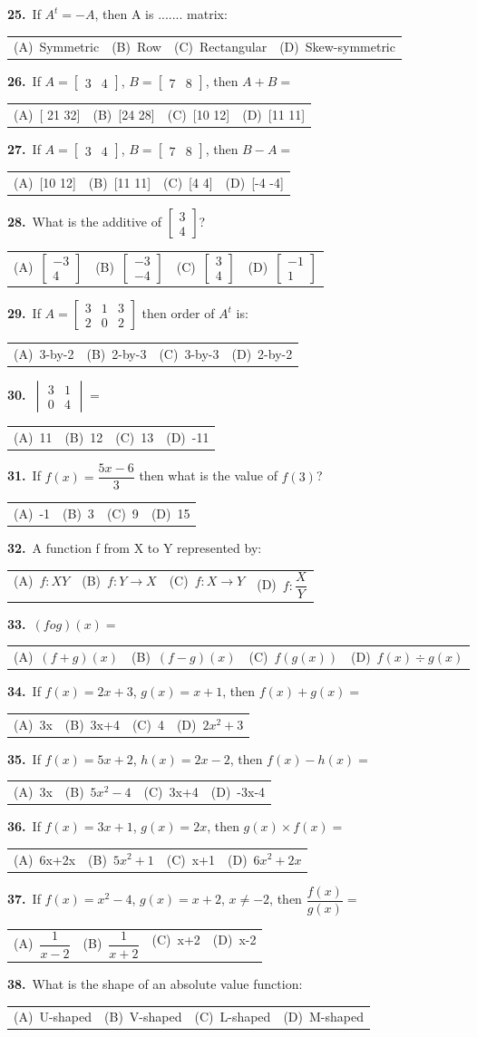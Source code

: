 \documentclass[11pt,a4paper]{article}
\makeatletter
\newcommand{\mcq}[6]{%
  \Needspace{4\baselineskip}%
  \par\medskip\noindent\textbf{#1.}\ #2\par\nopagebreak
  \noindent\begin{tabularx}{\linewidth}{@{\hspace{1.5em}}*{4}{>{\raggedright\arraybackslash}X}@{}}
    (A)~#3 & (B)~#4 & (C)~#5 & (D)~#6
  \end{tabularx}\par}
\makeatother
\begin{document}
\mcq{25}{If $A^{t}=-A$, then A is ....... matrix:}{Symmetric}{Row}{Rectangular}{Skew-symmetric}
\mcq{26}{If $A=\begin{bmatrix}3&4\end{bmatrix}$, $B=\begin{bmatrix}7&8\end{bmatrix}$, then $A+B=$}{[ 21 32]}{[24 28]}{[10 12]}{[11 11]}
\mcq{27}{If $A=\begin{bmatrix}3&4\end{bmatrix}$, $B=\begin{bmatrix}7&8\end{bmatrix}$, then $B-A=$}{[10 12]}{[11 11]}{[4 4]}{[-4 -4]}
\mcq{28}{What is the additive of $\begin{bmatrix}3\\4\end{bmatrix}$?}{$\begin{bmatrix}-3\\4\end{bmatrix}$}{$\begin{bmatrix}-3\\-4\end{bmatrix}$}{$\begin{bmatrix}3\\4\end{bmatrix}$}{$\begin{bmatrix}-1\\1\end{bmatrix}$}
\mcq{29}{If $A=\begin{bmatrix}3&1&3\\2&0&2\end{bmatrix}$ then order of $A^{t}$ is:}{3-by-2}{2-by-3}{3-by-3}{2-by-2}
\mcq{30}{$\begin{vmatrix}3&1\\0&4\end{vmatrix}=$}{11}{12}{13}{-11}
\mcq{31}{If $f(x)=\dfrac{5x-6}{3}$ then what is the value of $f(3)$?}{-1}{3}{9}{15}
\mcq{32}{A function f from X to Y represented by:}{$f:XY$}{$f:Y\rightarrow X$}{$f:X\rightarrow Y$}{$f:\dfrac{X}{Y}$}
\mcq{33}{$(fog)(x)=$}{$(f+g)(x)$}{$(f-g)(x)$}{$f(g(x))$}{$f(x)\div g(x)$}
\mcq{34}{If $f(x)=2x+3$, $g(x)=x+1$, then $f(x)+g(x)=$}{3x}{3x+4}{4}{$2x^{2}+3$}
\mcq{35}{If $f(x)=5x+2$, $h(x)=2x-2$, then $f(x)-h(x)=$}{3x}{$5x^{2}-4$}{3x+4}{-3x-4}
\mcq{36}{If $f(x)=3x+1$, $g(x)=2x$, then $g(x)\times f(x)=$}{6x+2x}{$5x^{2}+1$}{x+1}{$6x^{2}+2x$}
\mcq{37}{If $f(x)=x^{2}-4$, $g(x)=x+2$, $x\neq-2$, then $\dfrac{f(x)}{g(x)}=$}{$\dfrac{1}{x-2}$}{$\dfrac{1}{x+2}$}{x+2}{x-2}
\mcq{38}{What is the shape of an absolute value function:}{U-shaped}{V-shaped}{L-shaped}{M-shaped}
\end{document}
